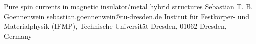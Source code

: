 \begin{conf-abstract}[]
{Pure spin currents in magnetic insulator/metal hybrid structures}
{\color{blue} Sebastian T. B. Goennenwein}
{sebastian.goennenwein@tu-dresden.de}
{Institut f\"{u}r Festk\"{o}rper- und Materialphysik (IFMP), Technische Universit\"{a}t Dresden, 01062 Dresden, Germany}
{\decofourleft \decofourright}





\printbibliography[heading=none]

\end{conf-abstract}
